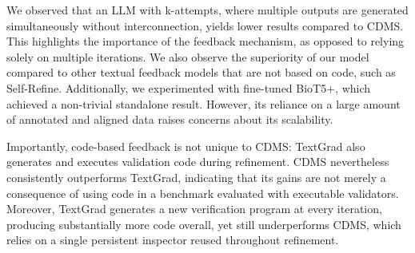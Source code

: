 \documentclass[10pt]{article} %
\begin{document}
We observed that an LLM with k-attempts, where multiple outputs are generated simultaneously without interconnection, yields lower results compared to CDMS. This highlights the importance of the feedback mechanism, as opposed to relying solely on multiple iterations.
We also observe the superiority of our model compared to other textual feedback models that are not based on code, such as Self-Refine.
Additionally, we experimented with fine-tuned BioT5+, which achieved a non-trivial standalone result. However, its reliance on a large amount of annotated and aligned data raises concerns about its scalability.

Importantly, code-based feedback is not unique to CDMS: TextGrad also generates and executes validation code during refinement. CDMS nevertheless consistently outperforms TextGrad, indicating that its gains are not merely a consequence of using code in a benchmark evaluated with executable validators. Moreover, TextGrad generates a new verification program at every iteration, producing substantially more code overall, yet still underperforms CDMS, which relies on a single persistent inspector reused throughout refinement.

    





\end{document}
